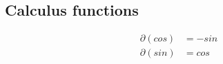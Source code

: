 \documentclass[a4paper]{article}
\begin{document}
\subsection{Calculus functions}
\begin{equation*}
\begin{array}{ll}
\partial(cos) &= - sin \\
\partial(sin) &= cos \\
\end{array}
\end{equation*}





\end{document}
